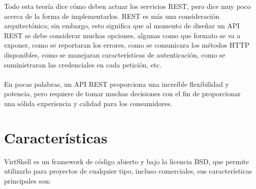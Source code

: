 Todo esta teoría dice cómo deben actuar los servicios REST, pero dice muy poco acerca de la forma de implementarlos. REST es más una consideración arquitectónica; sin embargo, esto significa que al momento de diseñar un API REST se debe considerar muchas opciones, algunas como que formato se va a exponer, como se reportaran los errores, como se comunicara los métodos HTTP disponibles, como se manejaran características de autenticación, como se suministraran las credenciales en cada petición, etc.\\
\\
En pocas palabras, un API REST proporciona una increíble flexibilidad y potencia, pero requiere de tomar muchas decisiones con el fin de proporcionar una sólida experiencia y calidad para los consumidores.

\section{Características}
VirtShell es un framework de código abierto y bajo la licencia BSD, que permite utilizarlo para proyectos de cualquier tipo, incluso comerciales, sus características principales son: 

